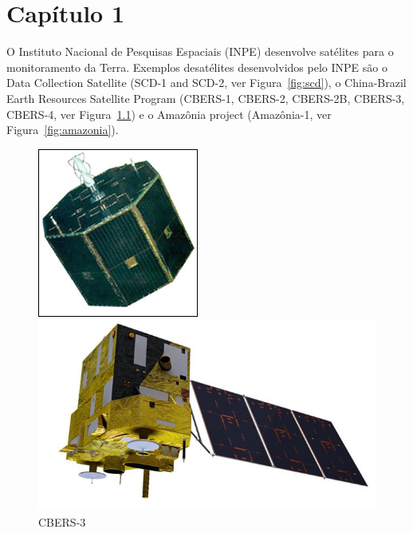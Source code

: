 \chapter{Cap\'itulo 1}
\label{ch:cap1}

\lipsum[1]

O Instituto Nacional de Pesquisas Espaciais (INPE) desenvolve sat\'elites para o monitoramento da Terra. Exemplos desat\'elites desenvolvidos pelo INPE s\~ao o Data Collection Satellite (SCD-1 and SCD-2, ver Figura~\ref{fig:scd}), o China-Brazil Earth Resources Satellite Program (CBERS-1, CBERS-2, CBERS-2B, CBERS-3, CBERS-4, ver Figura~\ref{fig:cbers}) e o Amaz\^onia project (Amaz\^onia-1, ver Figura~\ref{fig:amazonia}).

\begin{figure}[!htb]
    \centering
    \begin{minipage}{0.5\textwidth}
        \centering
        \includegraphics[trim=5 5 5 5, clip, width=0.4\linewidth]{./figuras/scd1_2}
        \caption{SCD-1}
        \label{fig:scd}
    \end{minipage}%
    \begin{minipage}{0.5\textwidth}
        \centering
        \includegraphics[width=0.7\linewidth]{./figuras/Cbers1}
        \caption{CBERS-3}
        \label{fig:cbers}
    \end{minipage}
    
    \vspace{1em}
    

\end{figure}
